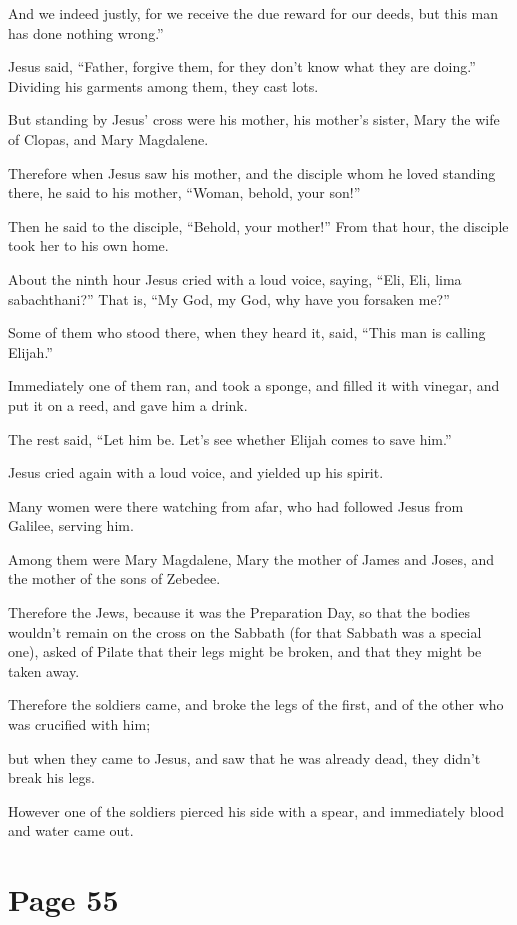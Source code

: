 And we indeed justly, for we receive the due reward for our deeds, but this man has done nothing wrong.”

Jesus said, “Father, forgive them, for they don’t know what they are doing.” Dividing his garments among them, they cast lots.

But standing by Jesus’ cross were his mother, his mother’s sister, Mary the wife of Clopas, and Mary Magdalene.

Therefore when Jesus saw his mother, and the disciple whom he loved standing there, he said to his mother, “Woman, behold, your son!”

Then he said to the disciple, “Behold, your mother!” From that hour, the disciple took her to his own home.

About the ninth hour Jesus cried with a loud voice, saying, “Eli, Eli, lima sabachthani?”  That is, “My God, my God, why have you forsaken me?”

Some of them who stood there, when they heard it, said, “This man is calling Elijah.”

Immediately one of them ran, and took a sponge, and filled it with vinegar, and put it on a reed, and gave him a drink.

The rest said, “Let him be. Let’s see whether Elijah comes to save him.”

Jesus cried again with a loud voice, and yielded up his spirit.

Many women were there watching from afar, who had followed Jesus from Galilee, serving him.

Among them were Mary Magdalene, Mary the mother of James and Joses, and the mother of the sons of Zebedee.

Therefore the Jews, because it was the Preparation Day, so that the bodies wouldn’t remain on the cross on the Sabbath (for that Sabbath was a special one), asked of Pilate that their legs might be broken, and that they might be taken away.

Therefore the soldiers came, and broke the legs of the first, and of the other who was crucified with him;

but when they came to Jesus, and saw that he was already dead, they didn’t break his legs.

However one of the soldiers pierced his side with a spear, and immediately blood and water came out.



\chapterornament
\section*{Page 55}

